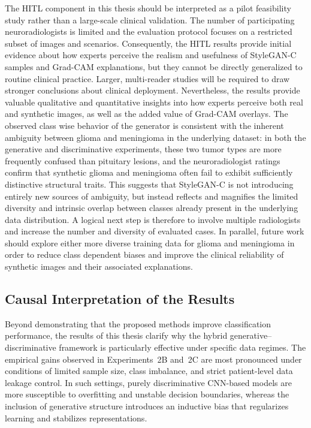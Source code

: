 The HITL component in this thesis should be interpreted as a pilot feasibility study rather than a large-scale clinical validation. The number of participating neuroradiologists is limited and the evaluation protocol focuses on a restricted subset of images and scenarios. Consequently, the HITL results provide initial evidence about how experts perceive the realism and usefulness of StyleGAN-C samples and Grad-CAM explanations, but they cannot be directly generalized to routine clinical practice. Larger, multi-reader studies will be required to draw stronger conclusions about clinical deployment. Nevertheless, the results provide valuable qualitative and quantitative insights into how experts perceive both real and synthetic images, as well as the added value of Grad-CAM overlays. The observed class wise behavior of the generator is consistent with the inherent ambiguity between glioma and meningioma in the underlying dataset: in both the generative and discriminative experiments, these two tumor types are more frequently confused than pituitary lesions, and the neuroradiologist ratings confirm that synthetic glioma and meningioma often fail to exhibit sufficiently distinctive structural traits. This suggests that StyleGAN-C is not introducing entirely new sources of ambiguity, but instead reflects and magnifies the limited diversity and intrinsic overlap between classes already present in the underlying data distribution. A logical next step is therefore to involve multiple radiologists and increase the number and diversity of evaluated cases. In parallel, future work should explore either more diverse training data for glioma and meningioma in order to reduce class dependent biases and improve the clinical reliability of synthetic images and their associated explanations.

\subsection{Causal Interpretation of the Results}

Beyond demonstrating that the proposed methods improve classification performance, the results of this thesis clarify why the hybrid generative--discriminative framework is particularly effective under specific data regimes. The empirical gains observed in Experiments~2B and~2C are most pronounced under conditions of limited sample size, class imbalance, and strict patient-level data leakage control. In such settings, purely discriminative CNN-based models are more susceptible to overfitting and unstable decision boundaries, whereas the inclusion of generative structure introduces an inductive bias that regularizes learning and stabilizes representations.\\

